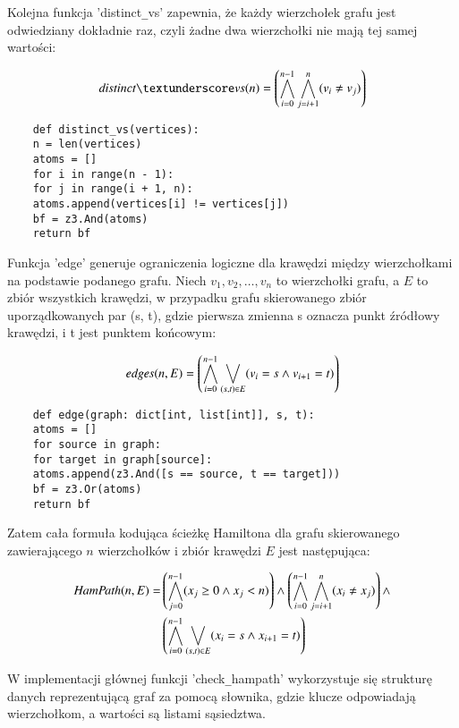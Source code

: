 Kolejna funkcja 'distinct\verb|_|vs' zapewnia, że każdy wierzchołek grafu jest odwiedziany dokładnie raz, czyli żadne dwa wierzchołki nie mają tej samej wartości:

\begin{align*}
	\mli{distinct\textunderscore vs}(n) = \left( \bigwedge_{i=0}^{n-1} \bigwedge_{j=i+1}^{n} (v_i \neq v_j) \right)
\end{align*}

\begin{lstlisting}	
	def distinct_vs(vertices):
	n = len(vertices)
	atoms = []
	for i in range(n - 1):
	for j in range(i + 1, n):
	atoms.append(vertices[i] != vertices[j])
	bf = z3.And(atoms)
	return bf
\end{lstlisting}
\vspace{1cm}

Funkcja 'edge' generuje ograniczenia logiczne dla krawędzi między wierzchołkami na podstawie podanego grafu. Niech $v_1, v_2, …, v_n$ to wierzchołki grafu, a \(E\) to zbiór wszystkich krawędzi, w przypadku grafu skierowanego zbiór uporządkowanych par (s, t), gdzie pierwsza zmienna s oznacza punkt źródłowy krawędzi, i t jest punktem końcowym:

\begin{align*}
	\mathit{edges}(n, E) = \left( \bigwedge_{i=0}^{n-1} \bigvee_{(s,t) \in E} (v_i = s \land v_{i+1} = t) \right)
\end{align*}

\begin{lstlisting}	
	def edge(graph: dict[int, list[int]], s, t):
	atoms = []
	for source in graph:
	for target in graph[source]:
	atoms.append(z3.And([s == source, t == target]))
	bf = z3.Or(atoms)
	return bf
\end{lstlisting}
\vspace{1cm}

Zatem cała formuła kodująca ścieżkę Hamiltona dla grafu skierowanego zawierającego \(n\) wierzchołków i zbiór krawędzi \(E\) jest następująca:

\begin{align*}
	{\mathit{HamPath}}(n, E) = & \left( \bigwedge_{j=0}^{n-1} (x_j \geq 0 \land x_j < n) \right) \land 
	\left( \bigwedge_{i=0}^{n-1} \bigwedge_{j=i+1}^{n} (x_i \neq x_j) \right) \land \\ 
	& \left( \bigwedge_{i=0}^{n-1} \bigvee_{(s,t) \in E} (x_i = s \land x_{i+1} = t) \right)
\end{align*}

W implementacji głównej funkcji 'check\verb|_|hampath' wykorzystuje się strukturę danych reprezentującą graf za pomocą słownika, gdzie klucze odpowiadają wierzchołkom, a wartości są listami sąsiedztwa.

